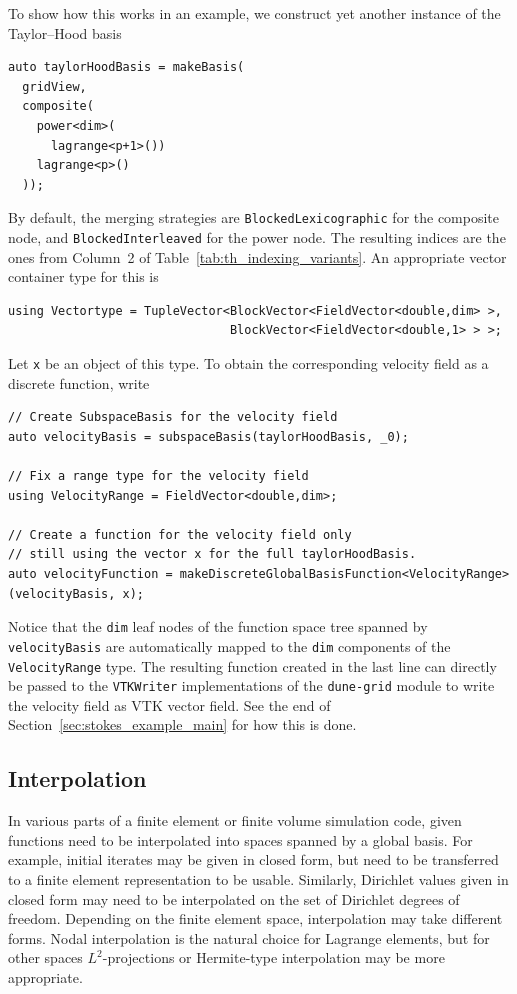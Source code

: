 \documentclass[a4paper,10pt,headings=normal,bibliography=totoc]{scrartcl}
\newcommand{\cpp}[1]{\lstinline[basicstyle=\ttfamily]!#1!}
\newcommand{\dunemodule}[1]{\texttt{#1}}
\begin{document}
To show how this works in an example, we construct yet another instance of the
Taylor--Hood basis
%
\begin{lstlisting}[style=Example]
auto taylorHoodBasis = makeBasis(
  gridView,
  composite(
    power<dim>(
      lagrange<p+1>())
    lagrange<p>()
  ));
\end{lstlisting}
By default, the merging strategies are \cpp{BlockedLexicographic} for the composite node,
and \cpp{BlockedInterleaved} for the power node.  The resulting indices are the ones
from Column~2 of Table~\ref{tab:th_indexing_variants}.  An appropriate vector container
type for this is
\begin{lstlisting}[style=Example]
using Vectortype = TupleVector<BlockVector<FieldVector<double,dim> >,
                               BlockVector<FieldVector<double,1> > >;
\end{lstlisting}
Let \cpp{x} be an object of this type.  To obtain the corresponding velocity field
as a discrete function, write
%
\begin{lstlisting}[style=Example]
// Create SubspaceBasis for the velocity field
auto velocityBasis = subspaceBasis(taylorHoodBasis, _0);

// Fix a range type for the velocity field
using VelocityRange = FieldVector<double,dim>;

// Create a function for the velocity field only
// still using the vector x for the full taylorHoodBasis.
auto velocityFunction = makeDiscreteGlobalBasisFunction<VelocityRange>(velocityBasis, x);
\end{lstlisting}

Notice that the \cpp{dim} leaf nodes of the function space
tree spanned by \cpp{velocityBasis} are automatically mapped to the
\cpp{dim} components of the \cpp{VelocityRange} type.
The resulting function created in the last line can directly
be passed to the \cpp{VTKWriter} implementations of the
\dunemodule{dune-grid} module to write the velocity field
as VTK vector field.
See the end of Section~\ref{sec:stokes_example_main}
for how this is done.



\subsection{Interpolation}

In various parts of a finite element or finite volume simulation code, given functions need to be interpolated
into spaces spanned by a global basis.  For example, initial iterates may be given in closed form, but need to be
transferred to a finite element representation to be usable.  Similarly, Dirichlet values given in closed form
may need to be interpolated on the set of Dirichlet degrees of freedom.  Depending on the finite element space,
interpolation may take different forms.  Nodal interpolation is the natural choice for Lagrange elements, but
for other spaces $L^2$-projections or Hermite-type interpolation may be more appropriate.
\end{document}
